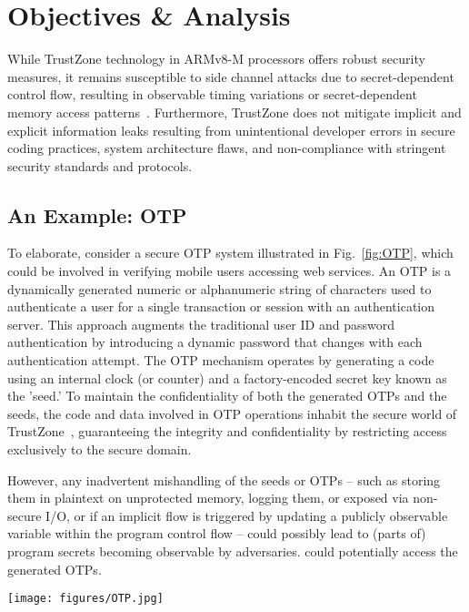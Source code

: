 \section{Objectives \& Analysis} \label{sect:design}
%
While TrustZone technology in ARMv8-M processors offers robust security
measures, it remains susceptible to side channel attacks due to
secret-dependent control flow, resulting in observable timing variations or
secret-dependent memory access patterns~\cite{armdeveloper}. Furthermore,
TrustZone does not mitigate implicit and explicit information leaks
resulting from unintentional developer errors in secure coding practices,
system architecture flaws, and non-compliance with stringent security
standards and protocols.

\subsection{An Example: OTP}

To elaborate, consider a secure \ac{OTP} system illustrated in
Fig.~\ref{fig:OTP}, which could be involved in verifying mobile users
accessing web services. An \ac{OTP} is a dynamically generated numeric or
alphanumeric string of characters used to authenticate a user for a single
transaction or session with an authentication server. This approach
augments the traditional user ID and password authentication by introducing
a dynamic password that changes with each authentication attempt. The
\ac{OTP} mechanism operates by generating a code using an internal clock
(or counter) and a factory-encoded secret key known as the 'seed.' To
maintain the confidentiality of both the generated \acp{OTP} and the seeds,
the code and data involved in \ac{OTP} operations inhabit the secure world
of TrustZone~\cite{trustotp}, guaranteeing the integrity and
confidentiality by restricting access exclusively to the secure domain.

However, any inadvertent mishandling of the seeds or \acp{OTP} -- such as
storing them in plaintext on unprotected memory, logging them, or exposed
via non-secure I/O, or if an implicit flow is triggered by updating a
publicly observable variable within the program control flow -- could
possibly lead to (parts of) program secrets becoming observable by
adversaries.  could potentially access the generated \acp{OTP}.

\begin{figure*}
  \centering
  \texttt{[image: figures/OTP.jpg]}
  \caption{TrustZone-based Implementation of Secure OTP Generation}
  \label{fig:OTP}
\end{figure*}

